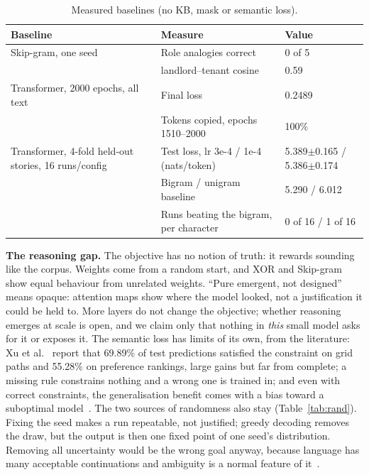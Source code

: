 \documentclass[letterpaper, 10pt, conference]{IEEEtran}
\begin{document}
\begin{table}[t]
\caption{Measured baselines (no KB, mask or semantic loss).}\label{tab:measured}
\centering\footnotesize\setlength{\tabcolsep}{3pt}
\begin{tabular}{@{}L{2.2cm}L{3.3cm}L{2.5cm}@{}}
\toprule
Baseline & Measure & Value\\
\midrule
Skip-gram, one seed & Role analogies correct & 0 of 5\\
 & landlord--tenant cosine & 0.59\\
Transformer, 2000 epochs, all text & Final loss & 0.2489\\
 & Tokens copied, epochs 1510--2000 & 100\%\\
Transformer, 4-fold held-out stories, 16 runs/config & Test loss, lr 3e-4 / 1e-4 (nats/token) & 5.389$\pm$0.165 / 5.386$\pm$0.174\\
 & Bigram / unigram baseline & 5.290 / 6.012\\
 & Runs beating the bigram, per character & 0 of 16 / 1 of 16\\
\bottomrule
\end{tabular}
\end{table}

\textbf{The reasoning gap.} The objective has no notion of truth: it rewards sounding like the corpus. Weights come from a random start, and XOR and Skip-gram show equal behaviour from unrelated weights. ``Pure emergent, not designed'' means opaque: attention maps show where the model looked, not a justification it could be held to. More layers do not change the objective; whether reasoning emerges at scale is open, and we claim only that nothing in \emph{this} small model asks for it or exposes it. The semantic loss has limits of its own, from the literature: Xu et al.~\cite{xu2018} report that 69.89\% of test predictions satisfied the constraint on grid paths and 55.28\% on preference rankings, large gains but far from complete; a missing rule constrains nothing and a wrong one is trained in; and even with correct constraints, the generalisation benefit comes with a bias toward a suboptimal model~\cite{wang2023}. The two sources of randomness also stay (Table~\ref{tab:rand}). Fixing the seed makes a run repeatable, not justified; greedy decoding removes the draw, but the output is then one fixed point of one seed's distribution. Removing all uncertainty would be the wrong goal anyway, because language has many acceptable continuations and ambiguity is a normal feature of it~\cite{piantadosi,holtzman}.
\end{document}
